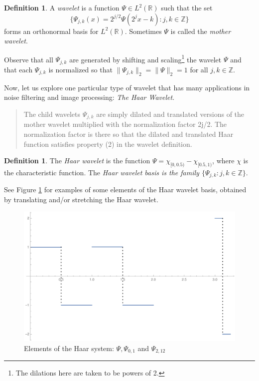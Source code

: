 \documentclass[2pt]{amsart}
\theoremstyle{theorem} %
\theoremstyle{definition}
\newtheorem{defn}[thm]{Definition}
\theoremstyle{example}
\theoremstyle{remark}
\numberwithin{equation}{section}
\newcommand{\R}{\mathbb{R}}
\newcommand{\Z}{\mathbb{Z}}
\begin{document}
\begin{defn} \label{def: wavelet}
	A \emph{wavelet} is a function $ \varPsi \in L^2(\R) $ such that the set
	\[ \{ \varPsi_{j,k}(x) = 2^{j/2} \varPsi (2^j x-k): j,k \in \Z  \} \]
	forms an orthonormal basis for $ L^2(\R) $. Sometimes $ \varPsi $ is called the \emph{mother wavelet}.
\end{defn}

Observe that all $ \varPsi_{j,k} $ are generated by shifting and scaling\footnote{The dilations here are taken to be powers of 2.} the wavelet $ \varPsi $ and that each $ \varPsi_{j,k} $ is normalized so that $ \| \varPsi_{j,k}\|_2 = \|\varPsi\|_2 = 1 $ for all $ j,k \in \Z $.

Now, let us explore one particular type of wavelet that has many applications in noise filtering and image processing: \emph{The Haar Wavelet}.

\begin{quote}
	The child wavelets $ \varPsi_{j,k} $ are simply dilated and translated versions of the mother wavelet multiplied with the normalization factor 2j/2. The normalization factor is there so that the dilated and translated Haar function satisfies property (2) in the wavelet	definition.
\end{quote}

\begin{defn}
	The \emph{Haar wavelet} is the function $ \varPsi = \chi_{[0,0.5)} - \chi_{[0.5,1)} $, where $ \chi $ is the characteristic function. The \emph{Haar wavelet basis is the family $ \{ \varPsi_{j,k}:j,k \in \Z \} $}.
\end{defn}
See Figure \ref{fig:haarsystem} for examples of some elements of the Haar wavelet basis, obtained by translating and/or stretching the Haar wavelet. 

\begin{figure}
	\centering
	\includegraphics[width=0.7\linewidth]{img/haar_system}
	\caption[Elements of the Haar system]{Elements of the Haar system: $ \varPsi, \varPsi_{0,1} $ and $ \varPsi_{2,12} $}
	\label{fig:haarsystem}
\end{figure}
\end{document}
